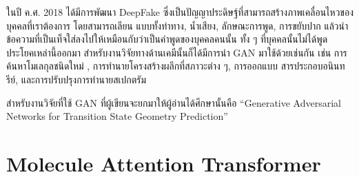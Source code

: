 ในปี ค.ศ. 2018 ได้มีการพัฒนา DeepFake ซึ่งเป็นปัญญาประดิษฐ์ที่สามารถสร้างภาพเคลื่อนไหวของบุคคลที่เราต้องการ โดยสามารถเลียน%
แบบทั้งท่าทาง, น้ำเสียง, ลักษณะการพูด, การขยับปาก แล้วนำข้อความที่เป็นเท็จใส่ลงไปให้เหมือนกับว่าเป็นคำพูดของบุคคลคนนั้น ทั้ง ๆ 
ที่บุคคลนั้นไม่ได้พูดประโยคเหล่านี้ออกมา สำหรับงานวิจัยทางด้านเคมีนั้นก็ได้มีการนำ GAN มาใช้ด้วยเช่นกัน เช่น การค้นหาโมเลกุลชนิดใหม่%
\autocite{prykhodko2019,lee2021,blanchard2021}, การทำนายโครงสร้างผลึกที่สภาวะต่าง ๆ\autocite{kim2020}, การออกแบบ%
สารประกอบอนินทรีย์\autocite{dan2020}, และการปรับปรุงการทำนายสเปกตรัม\autocite{al-mualem2022}

สำหรับงานวิจัยที่ใช้ GAN ที่ผู้เขียนจะยกมาให้ผู้อ่านได้ศึกษานั้นคือ \enquote{Generative Adversarial Networks for Transition State 
Geometry Prediction}\autocite{makos2021}

\section{Molecule Attention Transformer}
\label{sec:transformer}
